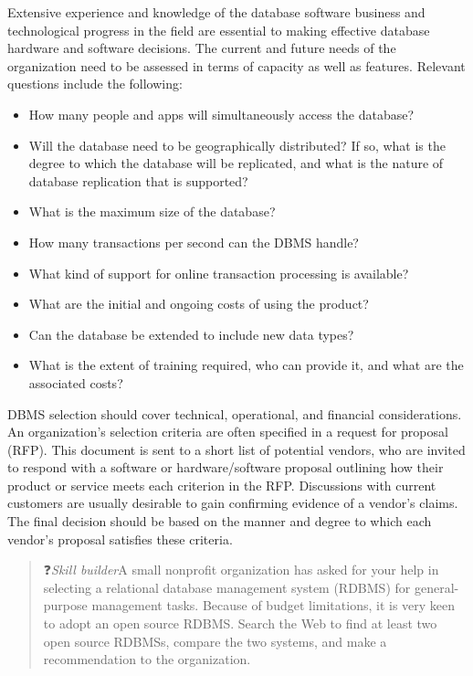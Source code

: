 \documentclass[
]{article}
\begin{document}
Extensive experience and knowledge of the database software business and
technological progress in the field are essential to making effective
database hardware and software decisions. The current and future needs
of the organization need to be assessed in terms of capacity as well as
features. Relevant questions include the following:

\begin{itemize}
\item
  How many people and apps will simultaneously access the database?
\item
  Will the database need to be geographically distributed? If so, what
  is the degree to which the database will be replicated, and what is
  the nature of database replication that is supported?
\item
  What is the maximum size of the database?
\item
  How many transactions per second can the DBMS handle?
\item
  What kind of support for online transaction processing is available?
\item
  What are the initial and ongoing costs of using the product?
\item
  Can the database be extended to include new data types?
\item
  What is the extent of training required, who can provide it, and
  what are the associated costs?
\end{itemize}

DBMS selection should cover technical, operational, and financial
considerations. An organization's selection criteria are often specified
in a request for proposal (RFP). This document is sent to a short list
of potential vendors, who are invited to respond with a software or
hardware/software proposal outlining how their product or service meets
each criterion in the RFP. Discussions with current customers are
usually desirable to gain confirming evidence of a vendor's claims. The
final decision should be based on the manner and degree to which each
vendor's proposal satisfies these criteria.

\begin{quote}
❓\emph{Skill builder}A small nonprofit organization has asked for your help
in selecting a relational database management system (RDBMS) for
general-purpose management tasks. Because of budget limitations, it is
very keen to adopt an open source RDBMS. Search the Web to find at
least two open source RDBMSs, compare the two systems, and make a
recommendation to the organization.
\end{quote}
\end{document}
